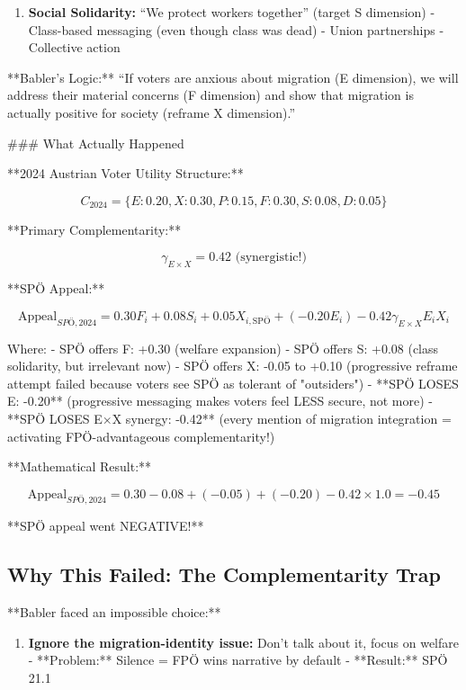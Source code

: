 {{{{{{{{\begin{enumerate}
\item \textbf{Social Solidarity:} ``We protect workers together'' (target S dimension)
   - Class-based messaging (even though class was dead)
   - Union partnerships
   - Collective action

\end{enumerate}

**Babler's Logic:** ``If voters are anxious about migration (E dimension), we will address their material concerns (F dimension) and show that migration is actually positive for society (reframe X dimension).''

### What Actually Happened

**2024 Austrian Voter Utility Structure:**

$$C_{2024} = \{E: 0.20, X: 0.30, P: 0.15, F: 0.30, S: 0.08, D: 0.05\}$$

**Primary Complementarity:**

$$\gamma_{E \times X} = 0.42 \text{ (synergistic!)}$$

**SPÖ Appeal:**

$$\text{Appeal}_{SPÖ,2024} = 0.30 F_i + 0.08 S_i + 0.05 X_{i,\text{SPÖ}} + (-0.20 E_i) - 0.42 \gamma_{E \times X} E_i X_i$$

Where:
- SPÖ offers F: +0.30 (welfare expansion)
- SPÖ offers S: +0.08 (class solidarity, but irrelevant now)
- SPÖ offers X: -0.05 to +0.10 (progressive reframe attempt failed because voters see SPÖ as tolerant of "outsiders")
- **SPÖ LOSES E: -0.20** (progressive messaging makes voters feel LESS secure, not more)
- **SPÖ LOSES E×X synergy: -0.42** (every mention of migration integration = activating FPÖ-advantageous complementarity!)

**Mathematical Result:**

$$\text{Appeal}_{SPÖ,2024} = 0.30 - 0.08 + (-0.05) + (-0.20) - 0.42 \times 1.0 = -0.45$$

**SPÖ appeal went NEGATIVE!**

\subsection{Why This Failed: The Complementarity Trap}

**Babler faced an impossible choice:**

\begin{enumerate}

\item \textbf{Ignore the migration-identity issue:} Don't talk about it, focus on welfare
   - **Problem:** Silence = FPÖ wins narrative by default
   - **Result:** SPÖ 21.1%


\end{enumerate}}}}}}}}}
